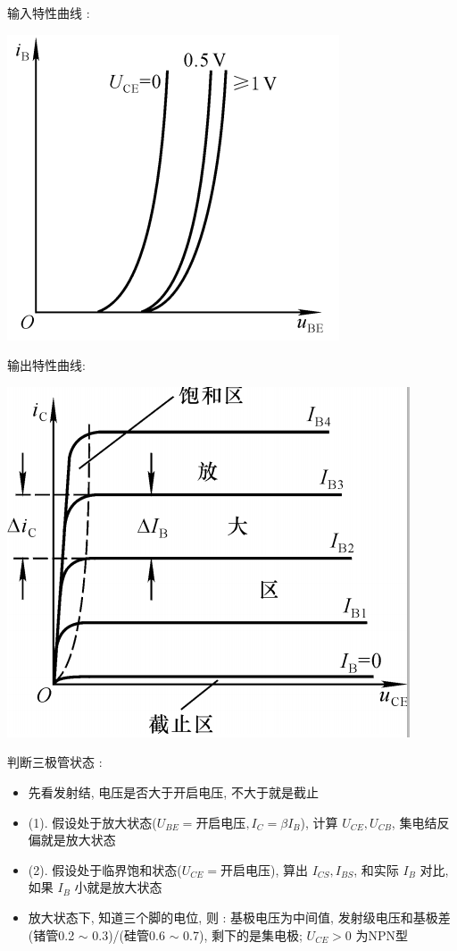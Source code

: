 \documentclass[UTF8, 12pt]{ctexart}
\begin{document}
	输入特性曲线 :

	\includegraphics[scale = 0.4]{01/晶体三极管输入特性曲线.png}

	输出特性曲线:

	\includegraphics[scale = 0.4]{01/晶体三极管输出特性曲线.png}

	判断三极管状态 : 
	\begin{itemize}[leftmargin = 4em]
		\item 先看发射结, 电压是否大于开启电压, 不大于就是截止
		\item (1). 假设处于放大状态($ U_{BE} = \text{开启电压}, I_{C} = \beta I_{B} $), 计算 $ U_{CE}, U_{CB} $, 集电结反偏就是放大状态
		\item (2). 假设处于临界饱和状态($ U_{CE} = \text{开启电压} $), 算出 $ I_{CS}, I_{BS} $, 和实际 $ I_{B} $ 对比, 如果 $ I_{B} $ 小就是放大状态
		\item 放大状态下, 知道三个脚的电位, 则 : 基极电压为中间值, 发射级电压和基极差(锗管0.2 $ \sim $ 0.3)/(硅管0.6 $ \sim $ 0.7), 剩下的是集电极; $ U_{CE} > 0 $ 为NPN型
	\end{itemize}
\end{document}
